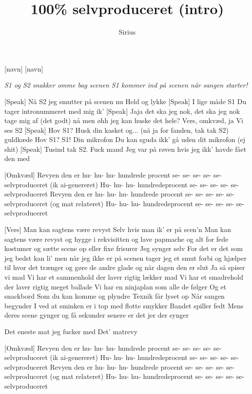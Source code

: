 \documentclass[a4paper,11pt]{article}
\title{100\% selvproduceret (intro)}
\author{Sirius}
\begin{document}
\maketitle

\begin{roles}
[navn] 
[navn] 
\end{roles}

\noindent\textit{S1 og S2 snakker omme bag scenen S1 kommer ind på scenen når sangen starter!} \\
\begin{song}
[Speak] 
Nå S2 jeg smutter på scenen nu 
Held og lykke
[Speak] 
I lige måde S1
Du tager intronummeret med mig ik'
[Speak] 
Jaja det ska jeg nok, det ska jeg nok tage mig af (det godt)
nå men øhh jeg kan huske det hele?
Vers, omkvæd, ja
Vi ses S2
[Speak] 
Hov S1? Husk din kasket og... (nå ja for fanden, tak tak S2)
guldkæde
Hov S1? S1! Din mikrofon
Du kan sguda ikk' gå uden dit mikrofon (ej shit)
[Speak] 
Tusind tak S2. Fuck mand
Jeg var på røven hvis jeg ikk' havde fået den med

[Omkvæd] 
Revyen den er hu- hu- hu- hundrede procent
se- se- se- se- se- selvproduceret (ik ai-genereret)
Hu- hu- hu- hundredeprocent
se- se- se- se- se- selvproduceret
Revyen den er hu- hu- hu- hundrede procent
se- se- se- se- se- selvproduceret (og mat relateret)
Hu- hu- hu- hundredeprocent
se- se- se- se- se- selvproduceret

[Vers]
Man kan sagtens være revyst
Selv hvis man ik' er på scen'n
Man kan sagtens være revyst
og hygge i rekvisitten
og lave papmache
og alt for fede kostumer
og sætte scene op
eller fixe frisurer
Jeg synger selv
For det er det som jeg bedst kan li'
men når jeg ikke er på scenen
tager jeg et smut forbi
og hjælper til hvor det trænger
og gøre de andre glade
og når dagen den er slut
Ja så spiser vi mad
Vi har et sammenhold der laver rigtig lækker mad
Vi har et smadrehold der laver rigtig meget ballade
Vi har en ninjaplan
som alle de følger
Og et snackbord
Som du kan komme og plyndre
Texnik får lyset op
Når sangen begynder
I ved at sminken er i top 
med flotte smykker
Bandet spiller fedt
Mens deres scene gynger
og få sekunder senere 
er det jer der synger

Det eneste mat jeg fucker med
Det' matrevy

[Omkvæd] 
Revyen den er hu- hu- hu- hundrede procent
se- se- se- se- se- selvproduceret (ik ai-genereret)
Hu- hu- hu- hundredeprocent
se- se- se- se- se- selvproduceret
Revyen den er hu- hu- hu- hundrede procent
se- se- se- se- se- selvproduceret (og mat relateret)
Hu- hu- hu- hundredeprocent
se- se- se- se- se- selvproduceret


\end{song}
\end{document}
